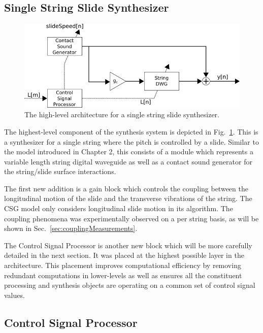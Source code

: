 \documentclass[../main.tex]{subfiles}
\begin{document}
\subsection{Single String Slide Synthesizer}

\begin{figure}[h]
    \centering
    \includegraphics[scale=.65]{./images/diagrams/slideSynth.png}
    \caption{The high-level architecture for a single string slide synthesizer.}
    \label{fig:slide_synth}
\end{figure}

The highest-level component of the synthesis system is depicted in Fig.~\ref{fig:slide_synth}. This is a synthesizer for a single string where the pitch is controlled by a slide. Similar to the model introduced in Chapter 2, this consists of a module which represents a variable length string digital waveguide as well as a contact sound generator for the string/slide surface interactions. 

The first new addition is a gain block which controls the coupling between the longitudinal motion of the slide and the transverse vibrations of the string. The CSG model only considers longitudinal slide motion in its algorithm. The coupling phenomena was experimentally observed on a per string basis, as will be shown in Sec.~\ref{sec:couplingMeasurements}.

The Control Signal Processor is another new block which will be more carefully detailed in the next section. It was placed at the highest possible layer in the architecture. This placement improves computational efficiency by removing redundant computations in lower-levels as well as ensures all the constituent processing and synthesis objects are operating on a common set of control signal values.

\subsection{Control Signal Processor}
\label{subsec:Ch3ControlSignalProcessor}
\end{document}
